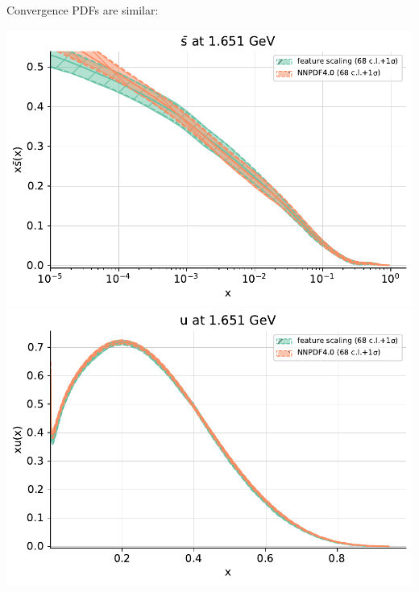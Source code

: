 \documentclass[aspectratio=169,11pt]{beamer}
\begin{document}
\begin{frame}[t]{Convergence}
  PDFs are similar:\\
  \begin{center}
    \includegraphics[height=0.5\textheight]{figures/pdf_sbar_log_feature_vs_nnpdf40.pdf}
    \includegraphics[height=0.5\textheight]{figures/pdf_u_lin_feature_vs_nnpdf40.pdf}
  \end{center}
\end{frame}
\end{document}
